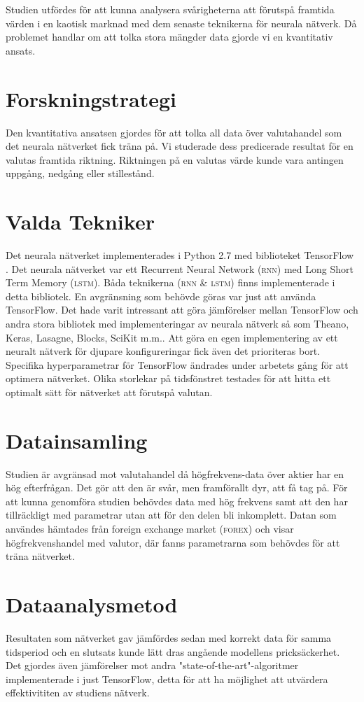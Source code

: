 Studien utfördes för att kunna analysera svårigheterna att förutspå framtida
värden i en kaotisk marknad med dem senaste teknikerna för neurala nätverk. Då
problemet handlar om att tolka stora mängder data gjorde vi en kvantitativ
ansats.

\section{Forskningstrategi}
Den kvantitativa ansatsen gjordes för att tolka all data över valutahandel som
det neurala nätverket fick träna på. Vi studerade dess predicerade resultat för
en valutas framtida riktning. Riktningen på en valutas värde kunde vara antingen
uppgång, nedgång eller stillestånd.

\section{Valda Tekniker}
Det neurala nätverket implementerades i Python 2.7 med biblioteket TensorFlow
\citep{tensorflow2015-whitepaper}. Det neurala nätverket var ett Recurrent
Neural Network \textsc{(rnn)} med Long Short Term Memory \textsc{(lstm)}. Båda
teknikerna \textsc{(rnn \& lstm)} finns implementerade i detta bibliotek. En avgränsning
som behövde göras var just att använda TensorFlow. Det hade varit intressant att
göra jämförelser mellan TensorFlow och andra stora bibliotek med
implementeringar av neurala nätverk så som Theano, Keras, Lasagne, Blocks,
SciKit m.m.. Att göra en egen implementering av ett neuralt nätverk för djupare
konfigureringar fick även det prioriteras bort. Specifika hyperparametrar för
TensorFlow ändrades under arbetets gång för att optimera nätverket. Olika
storlekar på tidsfönstret testades för att hitta ett optimalt sätt för nätverket
att förutspå valutan.

\section{Datainsamling}
Studien är avgränsad mot valutahandel då högfrekvens-data över aktier har en hög
efterfrågan. Det gör att den är svår, men framförallt dyr, att få tag på. För
att kunna genomföra studien behövdes data med hög frekvens samt att den har
tillräckligt med parametrar utan att för den delen bli inkomplett. Datan som
användes hämtades från foreign exchange market \textsc{(forex)} och visar
högfrekvenshandel med valutor, där fanns parametrarna som behövdes för att träna
nätverket.

\section{Dataanalysmetod}
Resultaten som nätverket gav jämfördes sedan med korrekt data för samma
tidsperiod och en slutsats kunde lätt dras angående modellens
pricksäckerhet. Det gjordes även jämförelser mot andra
"state-of-the-art"-algoritmer implementerade i just TensorFlow, detta för att ha
möjlighet att utvärdera effektivititen av studiens nätverk.
